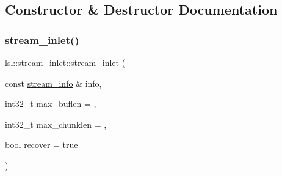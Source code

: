 \subsection{Constructor \& Destructor Documentation}
\mbox{\label{classlsl_1_1stream__inlet_a7c93b7d4fc053b2e3320841371b32919}} 
\subsubsection{\texorpdfstring{stream\+\_\+inlet()}{stream\_inlet()}}
{\footnotesize\ttfamily lsl\+::stream\+\_\+inlet\+::stream\+\_\+inlet (\begin{DoxyParamCaption}\item[{const \hyperlink{classlsl_1_1stream__info}{stream\+\_\+info} \&}]{info,  }\item[{int32\+\_\+t}]{max\+\_\+buflen = {},  }\item[{int32\+\_\+t}]{max\+\_\+chunklen = {},  }\item[{bool}]{recover = {\ttfamily true} }\end{DoxyParamCaption})\hspace{0.3cm}{\ttfamily [inline]}}

